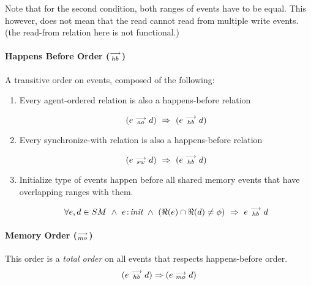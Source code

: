              {Note that for the second condition, both ranges of events have to be equal. This however, does not mean that the read cannot read from multiple write events. (the read-from relation here is not functional.)}
            
        \paragraph{Happens Before Order ($\stackrel{\longrightarrow}{_{hb}}$)}
            A transitive order on events, composed of the following:
            
            \begin{enumerate}
                \item Every agent-ordered relation is also a happens-before relation 
              
                    \[(e \stackrel{\longrightarrow}{_{ao}} d) \ \Rightarrow{} \ (e \stackrel{\longrightarrow}{_{hb}} d)\]
              
                \item Every synchronize-with relation is also a happens-before relation 
              
                    \[(e \stackrel{\longrightarrow}{_{sw}} d) \ \Rightarrow{} \ (e \stackrel{\longrightarrow}{_{hb}} d)\]
                     
                \item Initialize type of events happen before all shared memory events that have overlapping ranges with them. 
                
                    \[
                        \forall e,d \in SM \ \wedge \ 
                        \et{e}{init} \ \wedge \ 
                        (\Re(e) \cap \Re(d) \neq \phi)
                        \ \Rightarrow{} \ 
                        e \stck{_{hb}} d
                    \]
            \end{enumerate}
        
        
        \paragraph{Memory Order ($\stackrel{\longrightarrow}{_{mo}}$)}
            This order is a \textit{total order} on all events that respects happens-before order. 
                \[(e \stackrel{\longrightarrow}{_{hb}} d) \Rightarrow{} (e \stackrel{\longrightarrow}{_{mo}} d)\]
          